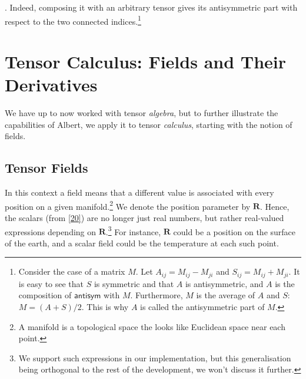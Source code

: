 \documentclass[nolinenum]{jfp}
\begin{document}
{}.
Indeed, composing it with an arbitrary tensor gives its antisymmetric
part with respect to the two connected indices.\footnote{Consider the
case of a matrix \(M\). Let \(A_{ij} = M_{ij} - M_{ji}\) and
\(S_{ij} = M_{ij} + M_{ji}\).  It is easy to see that \(S\) is
symmetric and that \(A\) is antisymmetric, and \(A\) is the
composition of \(\mathsf{antisym}\) with \(M\). Furthermore, \(M\) is
the average of \(A\) and \(S\): \(M = (A + S) / 2\). This is
why \(A\) is called the antisymmetric part of \(M\).} 

\section{Tensor Calculus: Fields and Their Derivatives}\label{122} 
We have up to now worked with tensor \emph{algebra}, but to further illustrate
the capabilities of {\sc{}Albert}, we apply it to tensor \emph{calculus},
starting with the notion of fields.

\subsection{Tensor Fields}\label{123} 
In this context a field means that a different value is associated
with every position on a given manifold.\footnote{A manifold is a
topological space the looks like Euclidean space near each point.}  We
denote the position parameter by \(\mathbf R\). Hence, the scalars
(from \cref{20}) are no longer just real numbers, but rather
real-valued expressions depending on \(\mathbf R\).\footnote{We
support such expressions in our implementation, but this
generalisation being orthogonal to the rest of the development, we
won't discuss it further.}  For instance, \(\mathbf R\) could be a
position on the surface of the earth, and a scalar field could be the
temperature at each such point.
\end{document}
